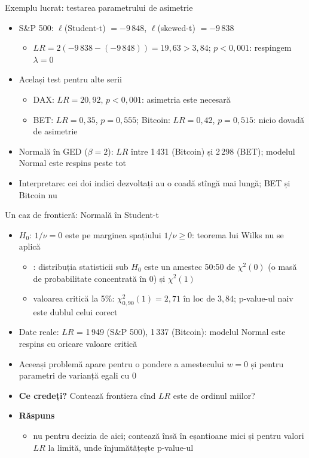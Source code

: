 \begin{frame}{Exemplu lucrat: testarea parametrului de asimetrie}
\itemsize{\small}
\begin{itemize}
    \item S\&P 500: $\ell$(Student-t) $= -9\,848$, $\ell$(skewed-t) $= -9\,838$
    \begin{itemize}
        \item $LR = 2(-9\,838 - (-9\,848)) = 19{,}63 > 3{,}84$; $p <0{,}001$: respingem $\lambda = 0$
    \end{itemize}
    \item Același test pentru alte serii
    \begin{itemize}
        \item DAX: $LR = 20{,}92$, $p <0{,}001$: asimetria este necesară
        \item BET: $LR = 0{,}35$, $p = 0{,}555$; Bitcoin: $LR = 0{,}42$, $p = 0{,}515$: nicio dovadă de asimetrie
    \end{itemize}
    \item Normală în GED ($\beta = 2$): $LR$ între 1\,431 (Bitcoin) și 2\,298 (BET); modelul Normal este respins peste tot
    \item Interpretare: cei doi indici dezvoltați au o coadă stîngă mai lungă; BET și Bitcoin nu
\end{itemize}
\end{frame}

\begin{frame}{Un caz de frontieră: Normală în Student-t}
\itemsize{\small}
\begin{itemize}
    \item $H_0$: $1/\nu = 0$ este pe marginea spațiului $1/\nu \ge 0$: teorema lui Wilks nu se aplică
    \begin{itemize}
        \item {}: distribuția statisticii sub $H_0$ este un amestec 50:50 de $\chi^2(0)$ (o masă de probabilitate concentrată în 0) și $\chi^2(1)$
        \item valoarea critică la 5\%: $\chi^2_{0{,}90}(1) = 2{,}71$ în loc de $3{,}84$; p-value-ul naiv este dublul celui corect
    \end{itemize}
    \item Date reale: $LR$ = 1\,949 (S\&P 500), 1\,337 (Bitcoin): modelul Normal este respins cu oricare valoare critică
    \item Aceeași problemă apare pentru o pondere a amestecului $w = 0$ și pentru parametri de varianță egali cu 0
    \item \textbf{Ce credeți?} Contează frontiera cînd $LR$ este de ordinul miilor?
    \item \textbf{Răspuns}
    \begin{itemize}
        \item nu pentru decizia de aici; contează însă în eșantioane mici și pentru valori $LR$ la limită, unde înjumătățește p-value-ul
    \end{itemize}
\end{itemize}
\end{frame}

